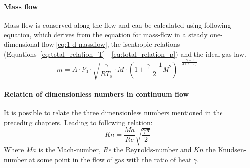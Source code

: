 	\paragraph{Mass flow}
		Mass flow is conserved along the flow and can be calculated using following equation, which derives from the equation for mass-flow in a steady one-dimensional flow \eqref{eq:1-d-massflow}, the isentropic relations (Equations~\eqref{eq:total_relation_T} - \eqref{eq:total_relation_p}) and the ideal gas law.
		\cite{benson_mass_nodate}
		\begin{equation}
			\dot{m} = A \cdot P_0 \cdot \sqrt{\frac{\gamma}{R T_0}} \cdot M \cdot \left(1 + \frac{\gamma - 1}{2} M^2\right)^{-\frac{\gamma + 1}{2(\gamma - 1)}}
			\label{eq:1-d-massflow}
		\end{equation}
	\paragraph{Relation of dimensionless numbers in continuum flow}
		It is possible to relate the three dimensionless numbers mentioned in the preceding chapters.
		Leading to following relation:
		\begin{equation}
			Kn = \frac{Ma}{Re}\sqrt{\frac{\gamma \pi}{2}}
			\label{eq:nondim-relation}
		\end{equation}
		Where $Ma$ is the Mach-number, $Re$ the Reynolds-number and $Kn$ the Knudsen-number at some point in the flow of gas with the ratio of heat $\gamma$.
		\cite{Cengel2017, LiLam1964, EMMONS1958}
